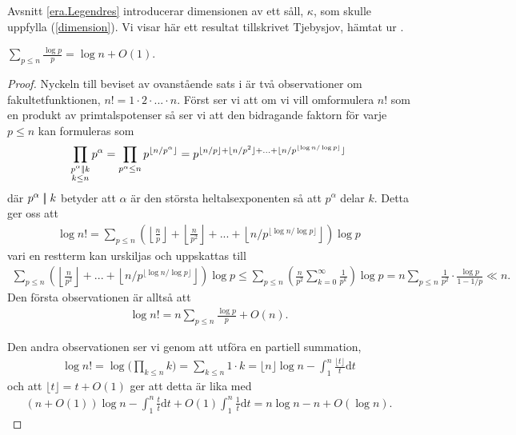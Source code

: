 Avsnitt \ref{era.Legendres} introducerar dimensionen av ett såll, \(\kappa\), som skulle uppfylla (\ref{dimension}). Vi visar här ett resultat tillskrivet Tjebysjov, hämtat ur \cite[Sats 1.4.3]{cojocarumurty}.
\begin{theorem} \label{APDX:THM1.4.3}
    $\sum_{p \leq n} \frac{\log p}{p} = \log n + O(1) $.
\end{theorem}
\begin{proof}
Nyckeln till beviset av ovanstående sats i \cite{cojocarumurty} är två observationer om fakultetfunktionen, \(n! = 1 \cdot 2 \cdot ... \cdot n\). Först ser vi att om vi vill omformulera \(n!\) som en produkt av primtalspotenser så ser vi att den bidragande faktorn för varje $p \leq n$ kan formuleras som 
\begin{align*}
    \prod_{\substack{p^\alpha \mid\!\mid k \\ k \leq n}} p^\alpha = \prod_{p^\alpha \leq n} p^{\lfloor n/p^{\alpha} \rfloor} = p^{\lfloor n/p \rfloor + \lfloor n/p^2 \rfloor + ... + \lfloor n / p^{\lfloor \log n / \log p \rfloor} \rfloor}
\end{align*}
där \(p^\alpha \mid\!\mid k\) betyder att \(\alpha\) är den största heltalsexponenten så att $p^\alpha$ delar $k$. Detta ger oss att 
\begin{align*}
    \log n! = %
    \sum_{p \leq n} \left(\left\lfloor\frac{n}{p} \right\rfloor + \left\lfloor \frac{n}{p^2} \right\rfloor + ... + \left\lfloor n / p^{\lfloor \log n / \log p \rfloor} \right\rfloor\right) \log p
\end{align*}
vari en restterm kan urskiljas och uppskattas till
\begin{align*}
    \sum_{p \leq n} \left(\left\lfloor \frac{n}{p^2} \right\rfloor + ... + \left\lfloor n / p^{\lfloor \log n / \log p \rfloor} \right\rfloor\right) \log p \leq
    \sum_{p \leq n} \left( \frac{n}{p^2}  \sum_{k=0}^\infty \frac{1}{p^k} \right) \log p
    = n \sum_{p \leq n} \frac{1}{p^2} \cdot \frac{\log p}{1 - 1/p} \ll n.
\end{align*} %
Den första observationen är alltså att
\begin{align} \label{APDX:obser1Thm1.4.3}
    \log n! = n \sum_{p \leq n} \frac{\log p}{p} + O(n).
\end{align}

Den andra observationen ser vi genom att utföra en partiell summation,
\begin{align*}
    \log n! = \log \Big(\prod_{k \leq n} k\Big) = \sum_{k \leq n} 1 \cdot k = 
    \lfloor n \rfloor \log n - \int_1^n \frac{\lfloor t \rfloor}{t} \text{d} t 
\end{align*}
och att \(\lfloor t \rfloor = t + O(1)\) ger att detta är lika med
\begin{align} \label{APDX:obser2Thm1.4.3}
    (n + O(1)) \log n - \int_1^n \frac{t}{t} \text{d} t + O(1) \int_1^n \frac{1}{t} \text{d} t  = n \log n - n + O(\log n).
\end{align}


\end{proof}
